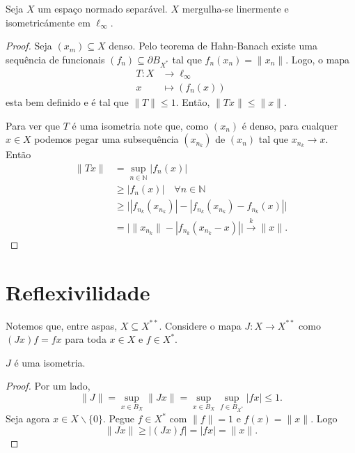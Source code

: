 \documentclass[portuguese]{article}
\theoremstyle{definition}
\newcommand{\N}{\mathbb{N}}
\begin{document}
	\begin{prop}
		Seja $X$ um espaço normado separável. $X$ mergulha-se linermente e isometricámente em $\ell_\infty$.
	\end{prop}
	\begin{proof}
		Seja $(x_m)\subseteq X$ denso. Pelo teorema de Hahn-Banach existe uma sequência de funcionais $(f_n)\subseteq\partial B_{X^*}$ tal que $f_n(x_n)=\| x_n\|$. Logo, o mapa
		\begin{align*}
			T:X&\to\ell_\infty\\
			x&\mapsto (f_n(x))
		\end{align*}
		esta bem definido e é tal que $\| T\|\leq 1$. Então, $\| Tx\|\leq\| x\|$.
		
		Para ver que $T$ é uma isometria note que, como $(x_n)$ é denso, para cualquer $x\in X$ podemos pegar uma subsequência $(x_{n_k})$ de $(x_n)$ tal que $x_{n_k}\to x$. Então
		\begin{align*}
			\| Tx\|&=\sup_{n\in\N}|f_n(x)|\\
			&\geq |f_n(x)|\quad\forall n\in\N\\
			&\geq\big||f_{n_k}(x_{n_k})|-|f_{n_k}(x_{n_k})-f_{n_k}(x)|\big|\\
			&=\big|\| x_{n_k}\|-|f_{n_k}(x_{n_k}-x)|\big|\overset{k}{\to}\| x\|.
		\end{align*}
	\end{proof}
	
	\section{Reflexivilidade}
	Notemos que, entre aspas, $X\subseteq X^{**}$. Considere o mapa $J:X\to X^{**}$ como $(Jx)f=fx$ para toda $x\in X$ e $f\in X^*$.
	
	\begin{prop}
		$J$ é uma isometria.
	\end{prop}
	\begin{proof}
		Por um lado,
		\[\| J\|=\sup_{x\in B_X}\| Jx\|=\sup_{x\in B_X}\sup_{f\in B_{X^*}}|fx|\leq1.\]
		Seja agora $x\in X\backslash\{0\}$. Pegue $f\in X^*$ com $\| f\|=1$ e $f(x)=\| x\|$. Logo
		\[\| Jx\|\geq|(Jx)f|=|fx|=\| x\|.\]
	\end{proof}
	
\end{document}
